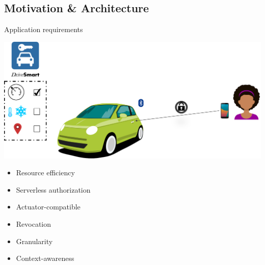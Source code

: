 \subsection{Motivation \& Architecture}

\begin{frame}{Application requirements}
    \begin{center}
        \includegraphics[scale=0.33]{Figures/ex_intro.png}
    \end{center}
    
    \begin{multicols}{2}
        \begin{itemize}
            \item Resource efficiency
            \item Serverless authorization
            \item Actuator-compatible
            \item Revocation
            \item Granularity
            \item Context-awareness
        \end{itemize}
    \end{multicols}
\end{frame}

